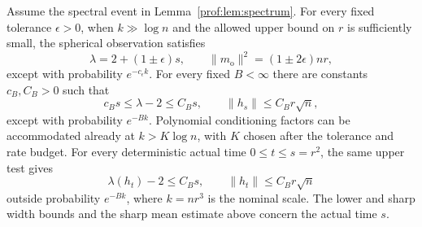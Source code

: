 \begin{lemma}\label{prof:lem:spherical-observation}
Assume the spectral event in Lemma~\ref{prof:lem:spectrum}.
For every fixed tolerance $\epsilon>0$, when $k\gg\log n$ and the
allowed upper bound on $r$ is sufficiently small, the spherical
observation satisfies
\[
 \lambda=2+(1\pm\epsilon)s,
 \qquad \|m_{\mathrm o}\|^2=(1\pm2\epsilon)nr,
\]
except with probability $e^{-c_\epsilon k}$. For every fixed $B<\infty$ there
are constants $c_B,C_B>0$ such that
\[
 c_Bs\le\lambda-2\le C_Bs,
 \qquad \|h_s\|\le C_Br\sqrt n,
\]
except with probability $e^{-Bk}$. Polynomial conditioning factors
can be accommodated already at $k>K\log n$, with $K$ chosen after the
tolerance and rate budget. For every deterministic actual time
$0\le t\le s=r^2$, the same upper test gives
\[
 \lambda(h_t)-2\le C_Bs,\qquad \|h_t\|\le C_Br\sqrt n
\]
outside probability $e^{-Bk}$, where $k=nr^3$ is the nominal scale.
The lower and sharp width bounds and the sharp mean estimate above
concern the actual time $s$.
\end{lemma}

